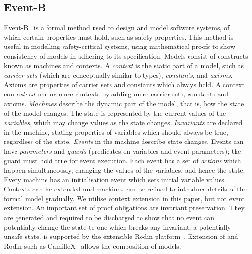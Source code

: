 \subsection{Event-B}
\label{sec:event-b}
Event-B~\cite{abrial10:_model_event_b} is a formal method used to
design and model software systems, of which certain properties must
hold, such as safety properties. This method is useful in modelling
safety-critical systems, using mathematical proofs to show consistency
of models in adhering to its specification. Models consist of
constructs known as machines and contexts. A \emph{context} is the
static part of a model, such as \emph{carrier sets} (which are
conceptually similar to types), \emph{constants}, and \emph{axioms}.
Axioms are properties of carrier sets and constants which always hold.  A context can \emph{extend} one or more contexts by adding more carrier sets, constants and axioms.  \emph{Machines} describe the dynamic part of the model, that is, how
the state of the model changes. The state is represented by the
current values of the \emph{variables}, which may change values as the
state changes.  \emph{Invariants} are declared in the machine, stating
properties of variables which should always be true, regardless of the
state.  \emph{Events} in the machine describe state changes.  Events
can have \emph{parameters} and \emph{guards} (predicates on variables and event
parameters); the guard must hold true for event execution.  Each
event has a set of \emph{actions} which happen simultaneously,
changing the values of the variables, and hence the state. Every
machine has an initialisation event which sets initial variable
values. Contexts can be extended and machines can be refined to introduce details of the formal model gradually. We utilise context extension in this paper, but not event extension. An important set of proof obligations are invariant
preservation.  They are generated and required to be discharged to
show that no event can potentially change the state to one which
breaks any invariant, a potentially unsafe state. \EventB is supported by the extensible Rodin platform~\cite{abrial10:_rodin}. Extension of \EventB and Rodin such as CamilleX~\cite{DBLP:conf/sefm/HoangSDFB22} allows the composition of models.

